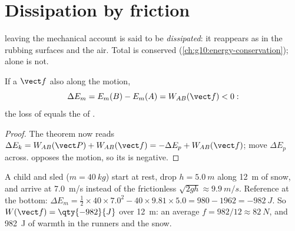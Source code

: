 \section{Dissipation by friction}

\begin{definition}[Dissipation]\label{def:g11:mechanical-energy:dissipation}
 leaving the mechanical account is said to be
\emph{dissipated}: it reappears as  in
the rubbing surfaces and the air. Total  is conserved
(\cref{ch:g10:energy-conservation});  alone is not.
\end{definition}

\begin{proposition}\label{prop:g11:mechanical-energy:deficit}
If a   $\vect f$ also  along the motion,
\[
\Delta E_m = E_m(B) - E_m(A) = W_{AB}(\vect f) < 0:
\]
the loss of  equals the  of .
\end{proposition}

\begin{proof}
The  theorem now reads $\Delta E_k = W_{AB}(\vect P) +
W_{AB}(\vect f) = -\Delta E_p + W_{AB}(\vect f)$; move $\Delta E_p$
across.  opposes the motion, so its  is negative.
\end{proof}

\begin{example}\label{ex:g11:mechanical-energy:toboggan}
A child and sled ($m = \qty{40}{kg}$) start at rest, drop
$h = \qty{5.0}{m}$ along \qty{12}{m} of snow, and arrive at
\qty{7.0}{m/s} instead of the frictionless
$\sqrt{2gh} \approx \qty{9.9}{m/s}$. Reference at the bottom:
$\Delta E_m = \tfrac12 \times 40 \times 7.0^2 - 40 \times 9.81
\times 5.0 = 980 - 1962 = \qty{-982}{J}$. So $W(\vect f) =
\qty{-982}{J}$ over \qty{12}{m}: an average  
$f = 982/12 \approx \qty{82}{N}$, and \qty{982}{J} of warmth in the
runners and the snow.
\end{example}

